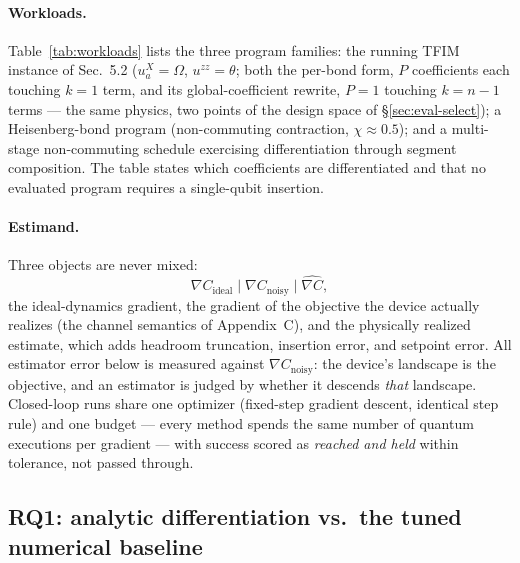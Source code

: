 \paragraph{Workloads.} Table~\ref{tab:workloads} lists the three program
families: the running TFIM instance of Sec.~5.2
($u^{X}_a=\Omega$, $u^{zz}=\theta$; both the per-bond form, $P$
coefficients each touching $k{=}1$ term, and its global-coefficient
rewrite, $P{=}1$ touching $k{=}n{-}1$ terms --- the same physics, two
points of the design space of \S\ref{sec:eval-select}); a Heisenberg-bond
program (non-commuting contraction, $\chi\approx0.5$); and a multi-stage
non-commuting schedule exercising differentiation through segment
composition. The table states which coefficients are differentiated and
that no evaluated program requires a single-qubit insertion.

\paragraph{Estimand.} Three objects are never mixed:
\[
\nabla C_{\mathrm{ideal}}
\;\big|\;
\nabla C_{\mathrm{noisy}}
\;\big|\;
\widehat{\nabla C},
\]
the ideal-dynamics gradient, the gradient of the objective the device
actually realizes (the channel semantics of Appendix~C), and the physically
realized estimate, which adds headroom truncation, insertion error, and
setpoint error. All estimator error below is measured against
$\nabla C_{\mathrm{noisy}}$: the device's landscape is the objective, and
an estimator is judged by whether it descends \emph{that} landscape.
Closed-loop runs share one optimizer (fixed-step gradient descent,
identical step rule) and one budget --- every method spends the same
number of quantum executions per gradient --- with success scored as
\emph{reached and held} within tolerance, not passed through.

\subsection{RQ1: analytic differentiation vs.\ the tuned numerical
baseline}
\label{sec:eval-fd}

